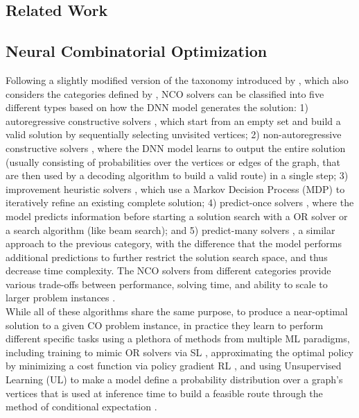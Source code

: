 \documentclass[orivec,runningheads]{llncs}
\begin{document}
\begin{center}
\begin{longtable}
\section{Related Work}
\subsection{Neural Combinatorial Optimization}
Following a slightly modified version of the taxonomy introduced by \cite{wu2024neural}, which also considers the categories defined by \cite{sun2023difusco}, NCO solvers can be classified into five different types based on how the DNN model generates the solution: 1) autoregressive constructive solvers \cite{Kool2018AttentionLT,kwon2020pomo,vinyals2015pointer}, which start from an empty set and build a valid solution by sequentially selecting unvisited vertices; 2) non-autoregressive constructive solvers \cite{joshi2019efficient,karalias2020erdos}, where the DNN model learns to output the entire solution (usually consisting of probabilities over the vertices or edges of the graph, that are then used by a decoding algorithm to build a valid route) in a single step; 3) improvement heuristic solvers \cite{ma2024learning}, which use a Markov Decision Process (MDP) to iteratively refine an existing complete solution; 4) predict-once solvers \cite{sun2023difusco}, where the model predicts information before starting a solution search with a OR solver or a search algorithm (like beam search); and 5) predict-many solvers \cite{liu2024evolution}, a similar approach to the previous category, with the difference that the model performs additional predictions to further restrict the solution search space, and thus decrease time complexity. The NCO solvers from different categories provide various trade-offs between performance, solving time, and ability to scale to larger problem instances \cite{joshi2020learning,sun2023difusco,wu2024neural}.\\
While all of these algorithms share the same purpose, to produce a near-optimal solution to a given CO problem instance, in practice they learn to perform different specific tasks using a plethora of methods from multiple ML paradigms, including training to mimic OR solvers via SL \cite{joshi2019efficient,sun2023difusco,vinyals2015pointer}, approximating the optimal policy by minimizing a cost function via policy gradient RL \cite{Kool2018AttentionLT,kwon2020pomo,ma2024learning}, and using Unsupervised Learning (UL) to make a model define a probability distribution over a graph's vertices that is used at inference time to build a feasible route through the method of conditional expectation \cite{karalias2020erdos}.


\end{longtable}
\end{center}
\end{document}
